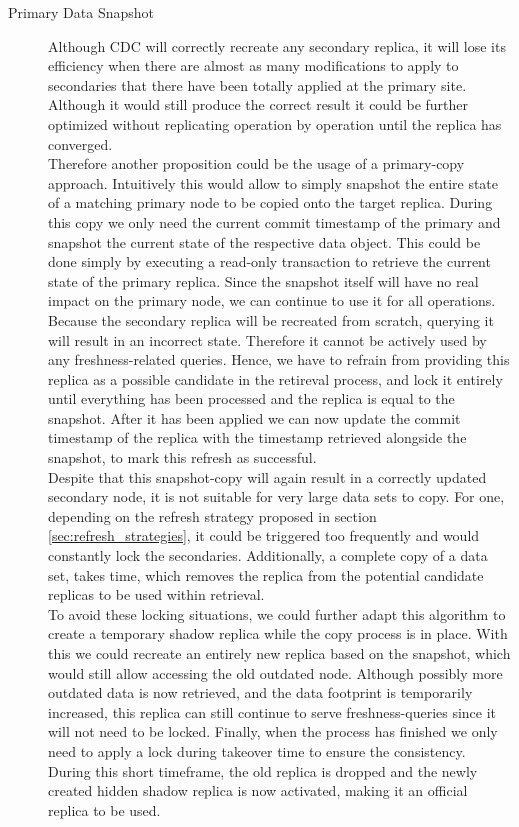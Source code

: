\begin{description}
    \item [Primary Data Snapshot]
    Although CDC will correctly recreate any secondary replica, it will lose its efficiency when there are almost as many modifications to apply to secondaries that there 
    have been totally applied at the primary site. Although it would still produce the correct result it could be further optimized without replicating operation by operation 
    until the replica has converged.\\
    Therefore another proposition could be the usage of a primary-copy approach. 
    Intuitively this would allow to simply snapshot the entire state of a matching primary node to be copied onto the target replica.
    During this copy we only need the current commit timestamp of the primary and snapshot the current state of the respective data object. 
    This could be done simply by executing a read-only transaction to retrieve the current state of the primary replica.
    Since the snapshot itself will have no real impact on the primary node, we can continue to use it for all operations.
    Because the secondary replica will be recreated from scratch, querying it will result in an incorrect state. 
    Therefore it cannot be actively used by any freshness-related queries.
    Hence, we have to refrain from providing this replica as a possible candidate in the retireval process, and lock it entirely 
    until everything has been processed and the replica is equal to the snapshot. After it has been applied we can now update the commit timestamp of the replica
    with the timestamp retrieved alongside the snapshot, to mark this refresh as successful.\\
    Despite that this snapshot-copy will again result in a correctly updated secondary node, it is not suitable for very large data sets to copy.  
    For one, depending on the refresh strategy proposed in section \ref{sec:refresh_strategies}, it could be triggered too frequently and would constantly lock the 
    secondaries. Additionally, a complete copy of a data set, takes time, which removes the replica from the potential candidate replicas to be used within retrieval.\\
    To avoid these locking situations, we could further adapt this algorithm to create a temporary shadow replica while the copy process is in place.
    With this we could recreate an entirely new replica based on the snapshot, which would still allow accessing the old outdated node.
    Although possibly more outdated data is now retrieved, and the data footprint is temporarily increased, this replica can still continue to serve freshness-queries 
    since it will not need to be locked.
    Finally, when the process has finished we only need to apply a lock during takeover time to ensure the consistency. During this short timeframe, the old replica is dropped
    and the newly created hidden shadow replica is now activated, making it an official replica to be used.




\end{description}
